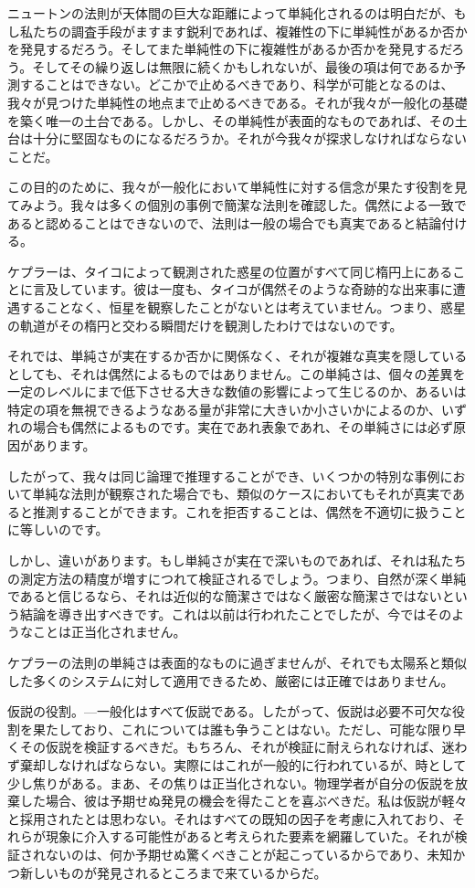 \documentclass[a4paper,11pt,openany]{ltjsbook}
\begin{document}
ニュートンの法則が天体間の巨大な距離によって単純化されるのは明白だが、もし私たちの調査手段がますます鋭利であれば、複雑性の下に単純性があるか否かを発見するだろう。そしてまた単純性の下に複雑性があるか否かを発見するだろう。そしてその繰り返しは無限に続くかもしれないが、最後の項は何であるか予測することはできない。どこかで止めるべきであり、科学が可能となるのは、我々が見つけた単純性の地点まで止めるべきである。それが我々が一般化の基礎を築く唯一の土台である。しかし、その単純性が表面的なものであれば、その土台は十分に堅固なものになるだろうか。それが今我々が探求しなければならないことだ。

この目的のために、我々が一般化において単純性に対する信念が果たす役割を見てみよう。我々は多くの個別の事例で簡潔な法則を確認した。偶然による一致であると認めることはできないので、法則は一般の場合でも真実であると結論付ける。

ケプラーは、タイコによって観測された惑星の位置がすべて同じ楕円上にあることに言及しています。彼は一度も、タイコが偶然そのような奇跡的な出来事に遭遇することなく、恒星を観察したことがないとは考えていません。つまり、惑星の軌道がその楕円と交わる瞬間だけを観測したわけではないのです。

それでは、単純さが実在するか否かに関係なく、それが複雑な真実を隠しているとしても、それは偶然によるものではありません。この単純さは、個々の差異を一定のレベルにまで低下させる大きな数値の影響によって生じるのか、あるいは特定の項を無視できるようなある量が非常に大きいか小さいかによるのか、いずれの場合も偶然によるものです。実在であれ表象であれ、その単純さには必ず原因があります。

したがって、我々は同じ論理で推理することができ、いくつかの特別な事例において単純な法則が観察された場合でも、類似のケースにおいてもそれが真実であると推測することができます。これを拒否することは、偶然を不適切に扱うことに等しいのです。

しかし、違いがあります。もし単純さが実在で深いものであれば、それは私たちの測定方法の精度が増すにつれて検証されるでしょう。つまり、自然が深く単純であると信じるなら、それは近似的な簡潔さではなく厳密な簡潔さではないという結論を導き出すべきです。これは以前は行われたことでしたが、今ではそのようなことは正当化されません。

ケプラーの法則の単純さは表面的なものに過ぎませんが、それでも太陽系と類似した多くのシステムに対して適用できるため、厳密には正確ではありません。

仮説の役割。—一般化はすべて仮説である。したがって、仮説は必要不可欠な役割を果たしており、これについては誰も争うことはない。ただし、可能な限り早くその仮説を検証するべきだ。もちろん、それが検証に耐えられなければ、迷わず棄却しなければならない。実際にはこれが一般的に行われているが、時として少し焦りがある。まあ、その焦りは正当化されない。物理学者が自分の仮説を放棄した場合、彼は予期せぬ発見の機会を得たことを喜ぶべきだ。私は仮説が軽々と採用されたとは思わない。それはすべての既知の因子を考慮に入れており、それらが現象に介入する可能性があると考えられた要素を網羅していた。それが検証されないのは、何か予期せぬ驚くべきことが起こっているからであり、未知かつ新しいものが発見されるところまで来ているからだ。
\end{document}
